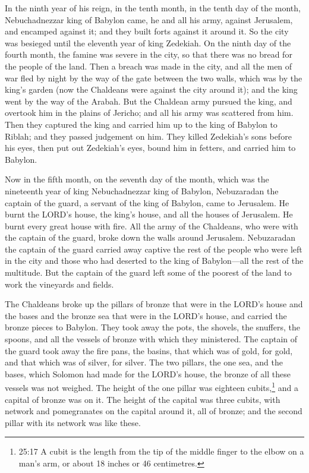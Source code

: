 In the ninth year of his reign, in the tenth month, in the
tenth day of the month, Nebuchadnezzar king of Babylon came, he and all
his army, against Jerusalem, and encamped against it; and they built
forts against it around it.  So the city was besieged until
the eleventh year of king Zedekiah.  On the ninth day of the
fourth month, the famine was severe in the city, so that there was no
bread for the people of the land.  Then a breach was made in
the city, and all the men of war fled by night by the way of the gate
between the two walls, which was by the king's garden (now the Chaldeans
were against the city around it); and the king went by the way of the
Arabah.  But the Chaldean army pursued the king, and
overtook him in the plains of Jericho; and all his army was scattered
from him.  Then they captured the king and carried him up to
the king of Babylon to Riblah; and they passed judgement on him.
 They killed Zedekiah's sons before his eyes, then put out
Zedekiah's eyes, bound him in fetters, and carried him to Babylon.

 Now in the fifth month, on the seventh day of the month,
which was the nineteenth year of king Nebuchadnezzar king of Babylon,
Nebuzaradan the captain of the guard, a servant of the king of Babylon,
came to Jerusalem.  He burnt the LORD's house, the king's
house, and all the houses of Jerusalem. He burnt every great house with
fire.  All the army of the Chaldeans, who were with the
captain of the guard, broke down the walls around Jerusalem.
 Nebuzaradan the captain of the guard carried away captive
the rest of the people who were left in the city and those who had
deserted to the king of Babylon---all the rest of the multitude.
 But the captain of the guard left some of the poorest of
the land to work the vineyards and fields.

 The Chaldeans broke up the pillars of bronze that were in
the LORD's house and the bases and the bronze sea that were in the
LORD's house, and carried the bronze pieces to Babylon. 
They took away the pots, the shovels, the snuffers, the spoons, and all
the vessels of bronze with which they ministered.  The
captain of the guard took away the fire pans, the basins, that which was
of gold, for gold, and that which was of silver, for silver.
 The two pillars, the one sea, and the bases, which Solomon
had made for the LORD's house, the bronze of all these vessels was not
weighed.  The height of the one pillar was eighteen
cubits,\footnote{25:17 A cubit is the length from the tip of the middle
  finger to the elbow on a man's arm, or about 18 inches or 46
  centimetres.} and a capital of bronze was on it. The height of the
capital was three cubits, with network and pomegranates on the capital
around it, all of bronze; and the second pillar with its network was
like these.


